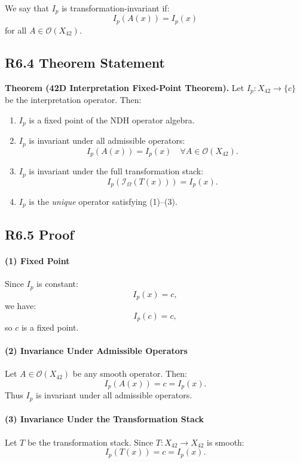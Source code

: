 We say that $I_p$ is transformation-invariant if:
\[
I_p(A(x)) = I_p(x)
\]
for all $A \in \mathcal{O}(X_{42})$.

\subsection*{R6.4 Theorem Statement}

\textbf{Theorem (42D Interpretation Fixed-Point Theorem).}  
Let $I_p : X_{42} \to \{c\}$ be the interpretation operator. Then:

\begin{enumerate}
    \item $I_p$ is a fixed point of the NDH operator algebra.
    \item $I_p$ is invariant under all admissible operators:
    \[
    I_p(A(x)) = I_p(x) \quad \forall A \in \mathcal{O}(X_{42}).
    \]
    \item $I_p$ is invariant under the full transformation stack:
    \[
    I_p(\mathcal{I}_{\Omega}(T(x))) = I_p(x).
    \]
    \item $I_p$ is the \emph{unique} operator satisfying (1)–(3).
\end{enumerate}

\subsection*{R6.5 Proof}

\paragraph{(1) Fixed Point}

Since $I_p$ is constant:
\[
I_p(x) = c,
\]
we have:
\[
I_p(c) = c,
\]
so $c$ is a fixed point.

\paragraph{(2) Invariance Under Admissible Operators}

Let $A \in \mathcal{O}(X_{42})$ be any smooth operator. Then:
\[
I_p(A(x)) = c = I_p(x).
\]
Thus $I_p$ is invariant under all admissible operators.

\paragraph{(3) Invariance Under the Transformation Stack}

Let $T$ be the transformation stack. Since $T : X_{42} \to X_{42}$ is
smooth:
\[
I_p(T(x)) = c = I_p(x).
\]

